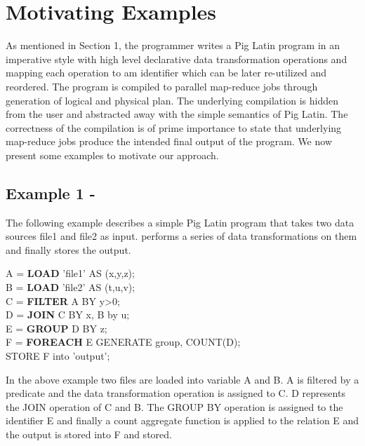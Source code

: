 \section{Motivating Examples}
\label{sec:motivation}

As mentioned in Section 1, the programmer writes a Pig Latin program in an imperative style with high level declarative data transformation operations and mapping each operation to am identifier which can be later re-utilized and reordered. The program is compiled to parallel map-reduce jobs through generation of logical and physical plan. The underlying compilation is hidden from the user and abstracted away with the simple semantics of Pig Latin. The correctness of the compilation is of prime importance to state that underlying map-reduce jobs produce the intended final output of the program.
We now present some examples to motivate our approach.

\subsection{Example 1 - }
\label{subsec:example1}

The following example\cite{gates2009building} describes a simple Pig Latin program that takes two data sources file1 and file2 as input. performs a series of data transformations on them and finally stores the output.
\begin{flushleft}
	A \: = \textbf{LOAD} \:'file1' AS (x,y,z); \\
	B \: = \textbf{LOAD} \:'file2' AS (t,u,v); \\
	C \: = \textbf{FILTER} \:A BY y>0; \\
	D \: = \textbf{JOIN} \:C BY x, B by u; \\
	E \: = \textbf{GROUP} \:D BY z; \\
	F \: = \textbf{FOREACH} \:E \:GENERATE group, COUNT(D); \\
	STORE \:F \:into \:'output';
\end{flushleft}

In the above example two files are loaded into variable A and B. A is filtered by a predicate and the data transformation operation is assigned to C. D represents the JOIN operation of C and B. The GROUP BY operation is assigned to the identifier E and finally a count aggregate function is applied to the relation E and the output is stored into F and stored.

